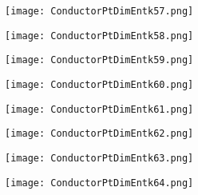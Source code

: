 \documentclass[pdf]{beamer}
\begin{document}
\begin{frame}
\begin{figure}[!h]
\centering
\texttt{[image: ConductorPtDimEntk57.png]}
\end{figure}
\end{frame}

\begin{frame}
\begin{figure}[!h]
\centering
\texttt{[image: ConductorPtDimEntk58.png]}
\end{figure}
\end{frame}

\begin{frame}
\begin{figure}[!h]
\centering
\texttt{[image: ConductorPtDimEntk59.png]}
\end{figure}
\end{frame}

\begin{frame}
\begin{figure}[!h]
\centering
\texttt{[image: ConductorPtDimEntk60.png]}
\end{figure}
\end{frame}

\begin{frame}
\begin{figure}[!h]
\centering
\texttt{[image: ConductorPtDimEntk61.png]}
\end{figure}
\end{frame}

\begin{frame}
\begin{figure}[!h]
\centering
\texttt{[image: ConductorPtDimEntk62.png]}
\end{figure}
\end{frame}

\begin{frame}
\begin{figure}[!h]
\centering
\texttt{[image: ConductorPtDimEntk63.png]}
\end{figure}
\end{frame}

\begin{frame}
\begin{figure}[!h]
\centering
\texttt{[image: ConductorPtDimEntk64.png]}
\end{figure}
\end{frame}
\end{document}
